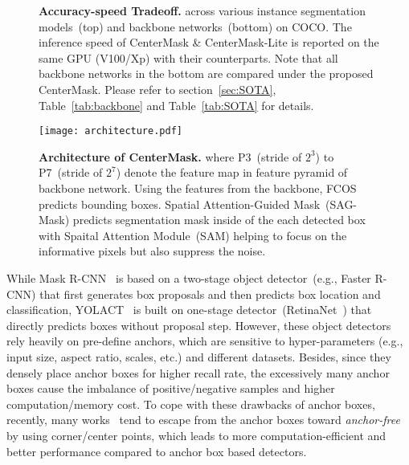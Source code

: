 \documentclass[10pt,twocolumn,letterpaper]{article}
\begin{document}
\begin{figure}[t]
\centering
\caption{\textbf{ Accuracy-speed Tradeoff.} across various instance segmentation models~(top) and backbone networks~(bottom) on COCO.
The inference speed of CenterMask \& CenterMask-Lite is reported on the same GPU (V100/Xp) with their counterparts.
Note that all backbone networks in the bottom are compared under the proposed CenterMask.
Please refer to section~\ref{sec:SOTA}, Table~\ref{tab:backbone} and Table~\ref{tab:SOTA} for details.}
\label{fig:FPS}
\vspace{-0.5cm}
\end{figure}

\begin{figure*}[t]
\centering
   \texttt{[image: architecture.pdf]} 
\caption{\textbf{Architecture of CenterMask.} where P3~(stride of $2^3$) to P7~(stride of $2^7$) denote the feature map in feature pyramid of backbone network. Using the features from the backbone, FCOS~\cite{Tian_2019_ICCV} predicts bounding boxes. Spatial Attention-Guided Mask~(SAG-Mask) predicts segmentation mask inside of the each detected box with Spaital Attention Module~(SAM) helping to focus on the informative pixels but also suppress the noise.}
\label{fig:architecture}
\vspace{-0.5cm}
\end{figure*}

While Mask R-CNN~\cite{he2017mask} is based on a two-stage object detector~(e.g., Faster R-CNN) that first generates box proposals and then predicts box location and classification, YOLACT~\cite{Bolya_2019_ICCV} is built on one-stage detector~(RetinaNet~\cite{lin2018focal}) that directly predicts boxes without proposal step.
However, these object detectors rely heavily on pre-define anchors, which are sensitive to hyper-parameters (e.g., input size, aspect ratio, scales, etc.) and different datasets. 
Besides, since they densely place anchor boxes for higher recall rate, the excessively many anchor boxes cause the imbalance of positive/negative samples and higher computation/memory cost.
To cope with these drawbacks of anchor boxes, recently, many works~\cite{law2018cornernet,Duan_2019_ICCV,zhou2019objects,zhou2019bottom,Tian_2019_ICCV,zhou2019objects} tend to escape from the anchor boxes toward \textit{anchor-free} by using corner/center points, which leads to more computation-efficient and better performance compared to anchor box based detectors.
\end{document}
